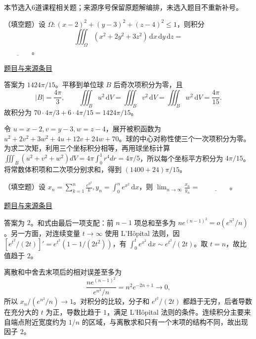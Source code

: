 \documentclass[UTF8,12pt,a4paper,fontset=fandol]{ctexart}
\begin{document}
本节选入6道课程相关题；来源序号保留原题解编排，未选入题目不重新补号。

\begin{example}[来源序号1]\label{ex:fin12-high:1}\label{pr:fin12-high:1}

（填空题）设 $\Omega:(x-2)^{2}+(y-3)^{2}+(z-4)^{2}\leq1$，则积分
\[
\iiint_{\Omega}\left(x^{2}+2y^{2}+3z^{2}\right)\,\mathrm{d}x\,\mathrm{d}y\,\mathrm{d}z=
\]
$\underline{\qquad\qquad}$。

\par\href{https://github.com/lzxcr/cmc-mathematics/blob/64916fa1fdbc3e444a652eca204d5669058ee321/src/problems/finals/12/01.md}{题目与来源条目}

\end{example}

\begin{solve}\label{ans:fin12-high:1}

答案为 $1424\pi/15$。平移到单位球 $B$ 后奇次项积分为零，且
\[
|B|=\frac{4\pi}{3},\qquad\iiint_Bu^2\,\mathrm dV=\iiint_Bv^2\,\mathrm dV=\iiint_Bw^2\,\mathrm dV=\frac{4\pi}{15}.
\]
故积分为 $70\cdot4\pi/3+6\cdot4\pi/15=1424\pi/15$。

令 $u=x-2,v=y-3,w=z-4$，展开被积函数为 $u^2+2v^2+3w^2+4u+12v+24w+70$。球的中心对称性使三个一次项积分为零。为求二次矩，利用三个坐标积分相等，再用球坐标计算 $\iiint_B(u^2+v^2+w^2)dV=4\pi\int_0^1r^4dr=4\pi/5$，所以每个坐标平方积分为 $4\pi/15$。将常数体积项和二次项分别求和，得到 $(1400+24)\pi/15$。

\end{solve}

\begin{example}[来源序号2]\label{ex:fin12-high:2}\label{pr:fin12-high:2}

（填空题）设 $x_{n}=\sum_{k=1}^{n}\frac{e^{k^{2}}}{k},y_{n}=\int_{0}^{n}e^{x^{2}}\,\mathrm{d}x$，则 $\lim_{n\to\infty}\frac{x_{n}}{y_{n}}=$ $\underline{\qquad\qquad}$。

\par\href{https://github.com/lzxcr/cmc-mathematics/blob/64916fa1fdbc3e444a652eca204d5669058ee321/src/problems/finals/12/02.md}{题目与来源条目}

\end{example}

\begin{solve}\label{ans:fin12-high:2}

答案为 $2$。和式由最后一项支配：前 $n-1$ 项总和至多为 $ne^{(n-1)^2}=o(e^{n^2}/n)$。另一方面，对连续变量 $t\to\infty$ 使用 L'Hôpital 法则，因 $[e^{t^2}/(2t)]'=e^{t^2}(1-1/(2t^2))$，有 $\int_0^te^{x^2}\,\mathrm dx\sim e^{t^2}/(2t)$。取 $t=n$，故比值趋于 $2$。

离散和中舍去末项后的相对误差至多为
\[
\frac{ne^{(n-1)^2}}{e^{n^2}/n}=n^2e^{-2n+1}\longrightarrow0,
\]
所以 $x_n/(e^{n^2}/n)\to1$。对积分的比较，分子和 $e^{t^2}/(2t)$ 都趋于无穷，后者导数在充分大的 $t$ 为正，导数比趋于 $1$，满足 L'Hôpital 法则的条件。连续积分主要来自端点附近宽度约为 $1/n$ 的区域，与离散求和只有一个末项的结构不同，故出现因子 $2$。

\end{solve}
\end{document}
